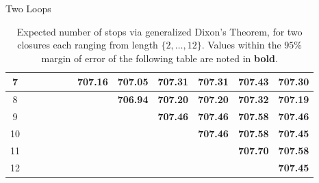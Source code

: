 \documentclass[hyphens,aspectratio=169]{beamer}
\begin{document}
\begin{frame}[fragile]{Two Loops}
\begin{table}[H]
\begin{adjustbox}{max width=\textwidth,max height=2\textheight}
\begin{tabular}{|c|c|c|c|c|c|c|c|c|c|c|c|}
				\hline
				7               &                 &                 &                 &                 &                 & \textbf{707.16} & \textbf{707.05} &
				\textbf{707.31} & \textbf{707.31} & \textbf{707.43} & \textbf{707.30}                                                                                                                                                 \\
				\hline
				8               &                 &                 &                 &                 &                 &                 & \textbf{706.94} & \textbf{707.20} &
				\textbf{707.20} & \textbf{707.32} & \textbf{707.19}                                                                                                                                                                   \\
				\hline
				9               &                 &                 &                 &                 &                 &                 &                 & \textbf{707.46} & \textbf{707.46} &
				\textbf{707.58} & \textbf{707.46}                                                                                                                                                                                     \\
				\hline
				10              &                 &                 &                 &                 &                 &                 &                 &                 & \textbf{707.46} & \textbf{707.58} &
				\textbf{707.45}                                                                                                                                                                                                       \\
				\hline
				11              &                 &                 &                 &                 &                 &                 &                 &                 &                 & \textbf{707.70} & \textbf{707.58} \\
				\hline
				12              &                 &                 &                 &                 &                 &                 &                 &                 &                 &                 & \textbf{707.45} \\
				\hline
			\end{tabular}

		\end{adjustbox}
		\caption{Expected number of stops via generalized Dixon's Theorem, for two closures each ranging
			from length $\{2,\dots,12\}$. Values within the $95\%$ margin of
			error of the following table are noted in
			\textbf{bold}.}
	\end{table}
\end{frame}
\end{document}
